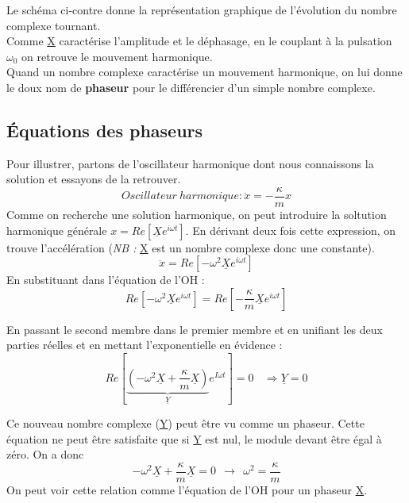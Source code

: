 \documentclass	[11pt, a4paper, openany]{book}
\begin{document}
Le schéma ci-contre donne la représentation graphique de l'évolution du nombre complexe tournant.\\

Comme \underline{X} caractérise l'amplitude et le déphasage, en le couplant à la pulsation $\omega_0$ on retrouve le mouvement harmonique.\\

Quand un nombre complexe caractérise un mouvement harmonique, on lui donne le doux nom de \textbf{phaseur} pour le différencier d'un simple nombre complexe.

\subsection{Équations des phaseurs}
Pour illustrer, partons de l'oscillateur harmonique dont nous connaissons la solution et essayons de la retrouver.
\begin{equation}
Oscillateur\ harmonique : \ddot{x} = -\frac{\kappa}{m}x
\end{equation}
Comme on recherche une solution harmonique, on peut introduire la soltution harmonique générale $x = Re\left[\underline{X}e^{i\omega t}\right]$. En dérivant deux fois cette expression, on trouve l'accélération (\textit{NB :} \underline{X} est un nombre complexe donc une constante).
\begin{equation}
\ddot{x} = Re\left[-\omega^2 \underline{X}e^{i\omega t}\right]
\end{equation}
En substituant dans l'équation de l'OH :
\begin{equation}
Re\left[-\omega^2 \underline{X}e^{i\omega t}\right] = Re\left[-\frac{\kappa}{m}\underline{X}e^{i\omega t}\right]
\end{equation}

En passant le second membre dans le premier membre et en unifiant les deux parties réelles et en mettant l'exponentielle en évidence :
\begin{equation}
Re\left[\underbrace{(-\omega^2\underline{X} + \frac{\kappa}{m}\underline{X})}_{\underline{Y}}e^{I\omega t}\right] = 0\ \ \ \ \Rightarrow \underline{Y} = 0
\end{equation}

Ce nouveau nombre complexe (\underline{Y}) peut être vu comme un phaseur. Cette équation ne peut être satisfaite que si \underline{Y} est nul, le module devant être égal à zéro. On a donc 
\begin{equation}
-\omega^2 \underline{X} + \frac{\kappa}{m}\underline{X} = 0\ \ \rightarrow\ \  \omega^2 = \frac{\kappa}{m}
\end{equation}
On peut voir cette relation comme l'équation de l'OH pour un phaseur \underline{X}.
\end{document}
